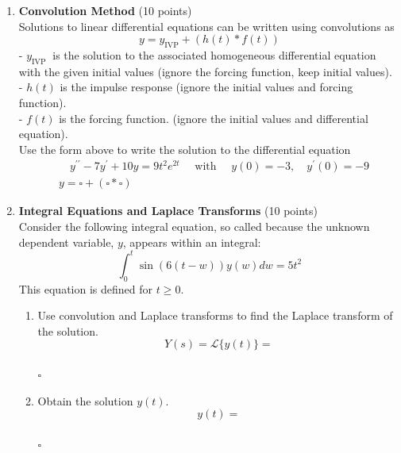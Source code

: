 \begin{enumerate}
  \newpage

  \item \textbf{Convolution Method} (10 points)\\
  Solutions to linear differential equations can be written using convolutions as
  $$
  y=y_{\mathrm{IVP}}+(h(t) * f(t))
  $$
  - $y_{\text {IVP }}$ is the solution to the associated homogeneous differential equation with the given initial values
  (ignore the forcing function, keep initial values).\\
  - $h(t)$ is the impulse response
  (ignore the initial values and forcing function).\\
  - $f(t)$ is the forcing function.
  (ignore the initial values and differential equation).\\
  Use the form above to write the solution to the differential equation
  $$
  \begin{aligned}
  & \quad y^{\prime \prime}-7 y^{\prime}+10 y=9 t^2 e^{2 t} \quad \text { with } \quad y(0)=-3, \quad y^{\prime}(0)=-9 \\
  & y=\square+(\square * \square)
  \end{aligned}
  $$
  \begin{subanswer}
  \end{subanswer}

  \item \textbf{Integral Equations and Laplace Transforms} (10 points)\\
  Consider the following integral equation, so called because the unknown dependent variable, $y$, appears within an integral:
  $$
  \int_0^t \sin (6(t-w)) y(w) d w=5 t^2
  $$
  This equation is defined for $t \geq 0$.
  \begin{enumerate}[label=\alph*]
    \item Use convolution and Laplace transforms to find the Laplace transform of the solution.\\
    $$
    Y(s)=\mathcal{L}\{y(t)\}=
    $$\\
    $\square$\\
    \begin{subanswer}
    \end{subanswer}
    \item Obtain the solution $y(t)$.\\
    $$
    y(t)=
    $$\\
    $\square$\\
    \begin{subanswer}
    \end{subanswer}
  \end{enumerate}


\end{enumerate}
